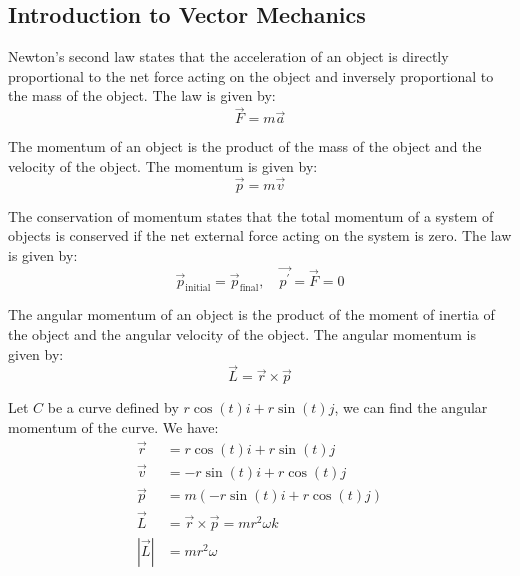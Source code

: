 \documentclass[11pt]{article}
\begin{document}
\subsection{Introduction to Vector Mechanics}
\begin{definition}
    Newton's second law states that the acceleration of an object is directly proportional to the net force acting on the object and inversely proportional to the mass of the object. The law is given by:
    \begin{equation}
        \vec{F} = m\vec{a}
    \end{equation}
\end{definition}
\begin{definition}[Momentum]
    The momentum of an object is the product of the mass of the object and the velocity of the object. The momentum is given by:
    \begin{equation}
        \vec{p} = m\vec{v}
    \end{equation}
\end{definition}
\begin{definition}
    The conservation of momentum states that the total momentum of a system of objects is conserved if the net external force acting on the system is zero. The law is given by:
    \begin{equation}
        \vec{p}_{\text{initial}} = \vec{p}_{\text{final}}, \quad \vec{p^\prime} = \vec{F} = 0
    \end{equation}
\end{definition}
\begin{definition}
    The angular momentum of an object is the product of the moment of inertia of the object and the angular velocity of the object. The angular momentum is given by:
    \begin{equation}
        \vec{L} = \vec{r} \times \vec{p}
    \end{equation}
\end{definition}
\begin{example}
    Let $C$ be a curve defined by $r\cos(t)i + r\sin(t)j$, we can find the angular momentum of the curve. We have:
    \begin{align*}
        \vec{r} &= r\cos(t)i + r\sin(t)j \\
        \vec{v} &= -r\sin(t)i + r\cos(t)j \\
        \vec{p} &= m(-r\sin(t)i + r\cos(t)j) \\
        \vec{L} &= \vec{r} \times \vec{p} = mr^2\omega k \\
        |\vec{L}| &= mr^2\omega
    \end{align*}
\end{example}
\end{document}
